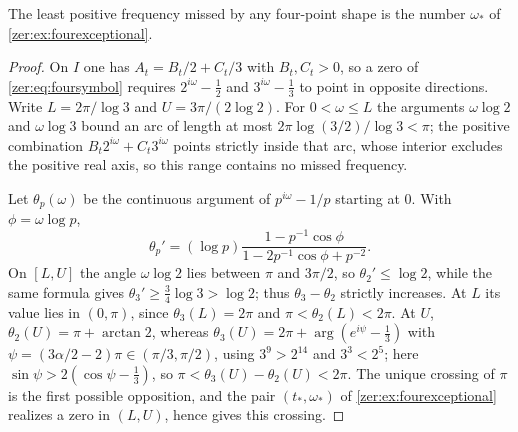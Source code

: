 \begin{proposition}\label{zer:prop:firstres}
The least positive frequency missed by any four-point shape is the number $\omega_*$ of
\cref{zer:ex:fourexceptional}.
\end{proposition}
\begin{proof}
On $I$ one has $A_t=B_t/2+C_t/3$ with $B_t,C_t>0$, so a zero of \eqref{zer:eq:foursymbol} requires
$2^{i\omega}-\tfrac12$ and $3^{i\omega}-\tfrac13$ to point in opposite directions. Write $L=2\pi/\log3$ and
$U=3\pi/(2\log2)$. For $0<\omega\le L$ the arguments $\omega\log2$ and $\omega\log3$ bound an arc of length at
most $2\pi\log(3/2)/\log3<\pi$; the positive combination $B_t2^{i\omega}+C_t3^{i\omega}$ points strictly inside
that arc, whose interior excludes the positive real axis, so this range contains no missed frequency.

Let $\theta_p(\omega)$ be the continuous argument of $p^{i\omega}-1/p$ starting at $0$. With $\phi=\omega\log p$,
\[
 \theta_p'=(\log p)\frac{1-p^{-1}\cos\phi}{1-2p^{-1}\cos\phi+p^{-2}} .
\]
On $[L,U]$ the angle $\omega\log2$ lies between $\pi$ and $3\pi/2$, so $\theta_2'\le\log2$, while the same
formula gives $\theta_3'\ge\tfrac34\log3>\log2$; thus $\theta_3-\theta_2$ strictly increases. At $L$ its value
lies in $(0,\pi)$, since $\theta_3(L)=2\pi$ and $\pi<\theta_2(L)<2\pi$. At $U$, $\theta_2(U)=\pi+\arctan2$, whereas
$\theta_3(U)=2\pi+\arg(e^{i\psi}-\tfrac13)$ with $\psi=(3\alpha/2-2)\pi\in(\pi/3,\pi/2)$, using $3^9>2^{14}$ and
$3^3<2^5$; here $\sin\psi>2(\cos\psi-\tfrac13)$, so $\pi<\theta_3(U)-\theta_2(U)<2\pi$. The unique crossing of
$\pi$ is the first possible opposition, and the pair $(t_*,\omega_*)$ of \cref{zer:ex:fourexceptional}
realizes a zero in $(L,U)$, hence gives this crossing.
\end{proof}

